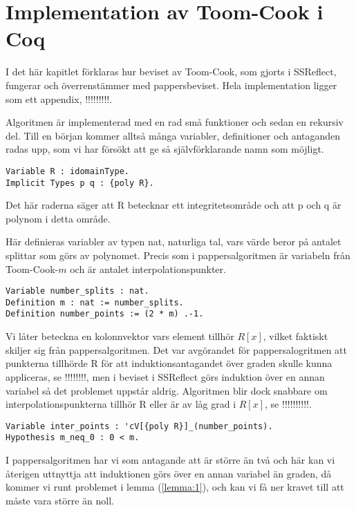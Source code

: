 \section{Implementation av Toom-Cook i Coq}
I det här kapitlet förklaras hur beviset av Toom-Cook, som gjorts i SSReflect,
fungerar och överrenstämmer med pappersbeviset. Hela implementation ligger som
ett appendix, !!!!!!!!!.

Algoritmen är implementerad med en rad små funktioner och sedan en rekursiv
del. Till en början kommer alltså många variabler, definitioner och antaganden
radas upp, som vi har försökt att ge så självförklarande namn som möjligt.

\begin{lstlisting}
Variable R : idomainType.
Implicit Types p q : {poly R}.
\end{lstlisting}

Det här raderna säger att R betecknar ett integritetsområde och att p och q är
polynom i detta område.

Här definieras variabler av typen nat, naturliga tal, vars värde beror på
antalet splittar som görs av polynomet. Precis som i pappersalgoritmen är 
variabeln från Toom-Cook-$m$ och  är antalet
interpolationspunkter.

\begin{lstlisting}
Variable number_splits : nat.
Definition m : nat := number_splits.
Definition number_points := (2 * m) .-1.
\end{lstlisting}

Vi låter  beteckna en kolonnvektor vars element tillhör $R[x]$,
vilket faktiskt skiljer sig från pappersalgoritmen. Det var avgörandet för
pappersalogritmen att punkterna tillhörde R för att induktionsantagandet över
graden skulle kunna appliceras, se !!!!!!!!, men i beviset i SSReflect görs
induktion över en annan variabel så det problemet uppstår aldrig. Algoritmen
blir dock snabbare om interpolationspunkterna tillhör R eller är av låg grad i
$R[x]$, se !!!!!!!!!!.

\begin{lstlisting}
Variable inter_points : 'cV[{poly R}]_(number_points).
Hypothesis m_neq_0 : 0 < m.
\end{lstlisting}

I pappersalgoritmen har vi som antagande att  är större än två och här kan
vi återigen uttnyttja att induktionen görs över en annan variabel än graden, då
kommer vi runt problemet i lemma (\ref{lemma:1}), och kan vi få ner kravet till
att  måste vara större än noll.

